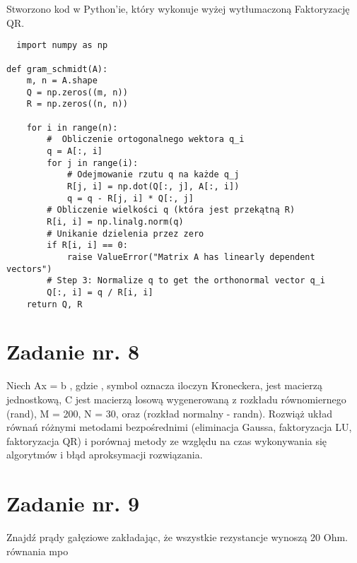 \documentclass{article}
\begin{document}
Stworzono kod w Python'ie, który wykonuje wyżej wytłumaczoną Faktoryzację QR.\\

\begin{lstlisting}
  import numpy as np

def gram_schmidt(A):
    m, n = A.shape
    Q = np.zeros((m, n))
    R = np.zeros((n, n))

    for i in range(n):
        #  Obliczenie ortogonalnego wektora q_i
        q = A[:, i]
        for j in range(i):
            # Odejmowanie rzutu q na każde q_j
            R[j, i] = np.dot(Q[:, j], A[:, i])
            q = q - R[j, i] * Q[:, j]
        # Obliczenie wielkości q (która jest przekątną R)
        R[i, i] = np.linalg.norm(q)
        # Unikanie dzielenia przez zero
        if R[i, i] == 0:
            raise ValueError("Matrix A has linearly dependent vectors")
        # Step 3: Normalize q to get the orthonormal vector q_i
        Q[:, i] = q / R[i, i]
    return Q, R

\end{lstlisting}
\newpage
\section{Zadanie nr. 8}

Niech Ax = b , gdzie , symbol  oznacza iloczyn Kroneckera,
 jest macierzą jednostkową,  C jest macierzą losową wygenerowaną z rozkładu
równomiernego (rand), M = 200, N = 30, oraz   (rozkład normalny - randn).
Rozwiąż układ równań różnymi metodami bezpośrednimi (eliminacja Gaussa, faktoryzacja LU,
faktoryzacja QR) i porównaj metody ze względu na czas wykonywania się algorytmów i błąd
aproksymacji rozwiązania.
\section{Zadanie nr. 9}
Znajdź prądy gałęziowe zakładając, że wszystkie rezystancje wynoszą 20 Ohm.
równania
mpo
\end{document}
